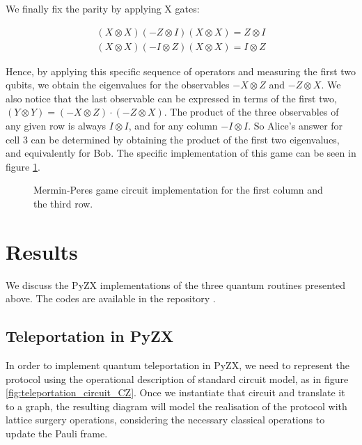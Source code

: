 \documentclass[12pt, twoside, openany]{book}
\begin{document}
We finally fix the parity by applying X gates:

\begin{align*}
    (X \otimes X)(-Z \otimes I)(X \otimes X) = Z \otimes I \\
    (X \otimes X)(-I \otimes Z)(X \otimes X) = I \otimes Z
\end{align*}

Hence, by applying this specific sequence of operators and measuring the first two qubits, we obtain the eigenvalues for the observables $-X \otimes Z$ and $-Z \otimes X$. We also notice that the last observable can be expressed in terms of the first two, $(Y \otimes Y) = (-X \otimes Z) \cdot (-Z \otimes X)$. The product of the three observables of any given row is always $I \otimes I$, and for any column $-I \otimes I$. So Alice's answer for cell 3 can be determined by obtaining the product of the first two eigenvalues, and equivalently for Bob. The specific implementation of this game can be seen in figure \ref{fig:mermin_peres_circuit}.

\begin{figure}[ht]
    \centering
    
    \caption{Mermin-Peres game circuit implementation for the first column and the third row.}
    \label{fig:mermin_peres_circuit}
\end{figure}

\chapter{Results} \label{ch:Results}

We discuss the PyZX implementations of the three quantum routines presented above. The codes are available in the repository \cite{Github}.

\section{Teleportation in PyZX}

In order to implement quantum teleportation in PyZX, we need to represent the protocol using the operational description of standard circuit model, as in figure \ref{fig:teleportation_circuit_CZ}. Once we instantiate that circuit and translate it to a graph, the resulting diagram will model the realisation of the protocol with lattice surgery operations, considering the necessary classical operations to update the Pauli frame. 
\end{document}
